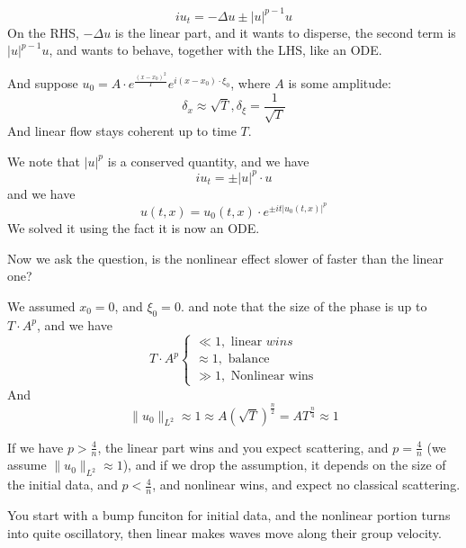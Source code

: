 \begin{equation*}
    iu_t=-\Delta u\pm|u|^{p-1}u
\end{equation*}
On the RHS, $-\Delta u$ is the linear part, and it wants to disperse, the second term is $|u|^{p-1}u$, and wants to behave, together with the LHS, like an ODE.

And suppose $u_0=A\cdot e^\frac{(x-x_0)^2}{T}e^{i(x-x_0)\cdot\xi_0}$, where $A$ is some amplitude:
\begin{equation*}
    \delta_x\approx\sqrt{T}, \delta_\xi=\frac{1}{\sqrt{T}}
\end{equation*}
And linear flow stays coherent up to time $T$.

We note that $|u|^p$ is a conserved quantity, and we have
\begin{equation*}
    iu_t=\pm|u|^p\cdot u
\end{equation*}
and we have
\begin{equation*}
    u(t,x)=u_0(t,x)\cdot e^{\pm it|u_0(t,x)|^p}
\end{equation*}
We solved it using the fact it is now an ODE.

Now we ask the question, is the nonlinear effect slower of faster than the linear one?

We assumed $x_0=0$, and $\xi_0=0$. and note that the size of the phase is up to $T\cdot A^p$, and we have
\begin{equation*}
    T\cdot A^p\begin{cases}
        \ll 1, \text{ linear } wins\\
        \approx 1, \text{ balance }\\
        \gg 1, \text{ Nonlinear wins}
    \end{cases}
\end{equation*}
And 
\begin{equation*}
    \|u_0\|_{L^2}\approx 1\approx A(\sqrt{T})^\frac{n}{2}=AT^\frac{n}{4}\approx 1
\end{equation*}

If we have $p>\frac{4}{n}$, the linear part wins and you expect scattering, and $p=\frac{4}{n}$ (we assume $\|u_0\|_{L^2}\approx 1$), and if we drop the assumption, it depends on the size of the initial data, and $p<\frac{4}{n}$, and nonlinear wins, and expect no classical scattering.

You start with a bump funciton for initial data, and the nonlinear portion turns into quite oscillatory, then linear makes waves move along their group velocity. 